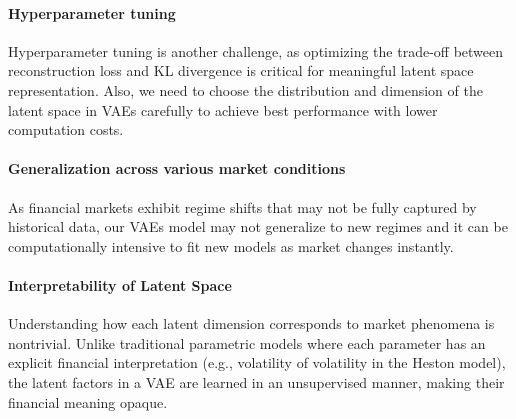 \documentclass{article}
\begin{document}
\paragraph{Hyperparameter tuning} Hyperparameter tuning is another challenge, as optimizing the trade-off between reconstruction loss and KL divergence is critical for meaningful latent space representation. Also, we need to choose the distribution and dimension of the latent space in VAEs carefully to achieve best performance with lower computation costs.

\paragraph{Generalization across various market conditions}
 As financial markets exhibit regime shifts that may not be fully captured by historical data, our VAEs model may not generalize to new regimes and it can be computationally intensive to fit new models as market changes instantly.

\paragraph{Interpretability of Latent Space}
Understanding how each latent dimension corresponds to market phenomena is nontrivial. Unlike traditional parametric models where each parameter has an explicit financial interpretation (e.g., volatility of volatility in the Heston model), the latent factors in a VAE are learned in an unsupervised manner, making their financial meaning opaque.


\newpage
\printbibliography
\end{document}

